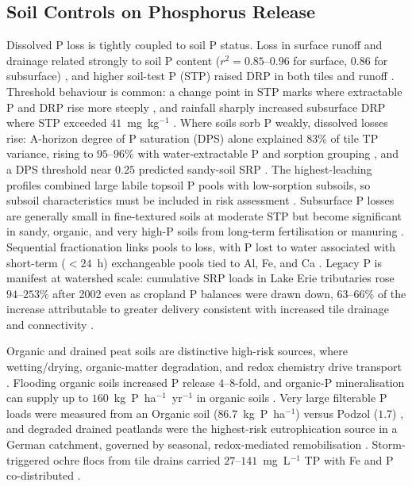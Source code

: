 \documentclass[11pt]{article}
\begin{document}
\subsection{Soil Controls on Phosphorus Release}

Dissolved P loss is tightly coupled to soil P status. Loss in surface runoff
and drainage related strongly to soil P content
($r^2 = 0.85$--$0.96$ for surface, $0.86$ for subsurface)
\parencite{Sharpley1995}, and higher soil-test P (STP) raised DRP in both
tiles and runoff \parencite{Osterholz2020}. Threshold behaviour is common: a
change point in STP marks where extractable P and DRP rise more steeply
\parencite{McDowell2001b}, and rainfall sharply increased subsurface DRP
where STP exceeded $41$~mg~kg$^{-1}$ \parencite{Ni2020}. Where soils sorb P
weakly, dissolved losses rise: A-horizon degree of P saturation (DPS) alone
explained $83\%$ of tile TP variance, rising to $95$--$96\%$ with
water-extractable P and sorption grouping \parencite{Beauchemin2003}, and a
DPS threshold near $0.25$ predicted sandy-soil SRP \parencite{Siemens2004}.
The highest-leaching profiles combined large labile topsoil P pools with
low-sorption subsoils, so subsoil characteristics must be included in
risk assessment \parencite{Liu2024b}. Subsurface P losses are generally
small in fine-textured soils at moderate STP but become significant in
sandy, organic, and very high-P soils from long-term fertilisation or
manuring \parencite{Sims1998}. Sequential fractionation links pools to loss,
with P lost to water associated with short-term ($<24$~h) exchangeable pools
tied to Al, Fe, and Ca \parencite{McDowell2001}. Legacy P is manifest at
watershed scale: cumulative SRP loads in Lake Erie tributaries rose
$94$--$253\%$ after 2002 even as cropland P balances were drawn down,
$63$--$66\%$ of the increase attributable to greater delivery consistent
with increased tile drainage and connectivity \parencite{Jarvie2017}.

Organic and drained peat soils are distinctive high-risk sources, where
wetting/drying, organic-matter degradation, and redox chemistry drive
transport \parencite{Grenon2021}. Flooding organic soils increased P release
$4$--$8$-fold, and organic-P mineralisation can supply up to
$160$~kg~P~ha$^{-1}$~yr$^{-1}$ in organic soils \parencite{Sharpley1995}.
Very large filterable P loads were measured from an Organic soil
($86.7$~kg~P~ha$^{-1}$) versus Podzol ($1.7$) \parencite{McDowell2015b}, and
degraded drained peatlands were the highest-risk eutrophication source in a
German catchment, governed by seasonal, redox-mediated remobilisation
\parencite{Tiemeyer2009,YliHalla2022}. Storm-triggered ochre flocs from tile
drains carried $27$--$141$~mg~L$^{-1}$ TP with Fe and P co-distributed
\parencite{Zimmer2016}.
\end{document}

